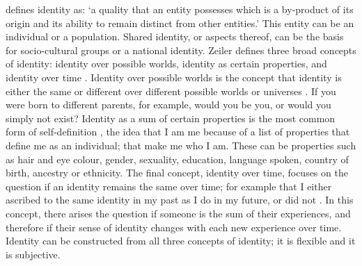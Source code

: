 \textcite{Wiley_1981} defines identity as: ‘a quality that an entity possesses which is a by-product of its origin and its ability to remain distinct from other entities.’ This entity can be an individual or a population. Shared identity, or aspects thereof, can be the basis for socio-cultural groups or a national identity. Zeiler defines three broad concepts of identity: 
identity over possible worlds, identity as certain properties, and identity over time \parencite{Zeiler_2007}. Identity over possible worlds is the concept that identity is either the same or different over different possible worlds or universes \parencite{Zeiler_2007}.  
If you were born to different parents, for example, would you be you, or would you simply not exist? Identity as a sum of certain properties is the most common form of self-definition \parencite{Zeiler_2007}, 
the idea that I am me because of a list of properties that define me as an individual; that make me who I am. These can be properties such as hair and eye colour, gender, sexuality, education, language spoken, country of birth, ancestry or ethnicity. The final concept, identity over time, focuses on the question if an identity remains the same over time; for example that I either ascribed to the same identity in my past as I do in my future, or did not \parencite{Zeiler_2007}. In this concept, there arises the question if someone is the sum of their experiences, and therefore if their sense of identity changes with each new experience over time. Identity can be constructed from all three concepts of identity; it is flexible and it is subjective.


